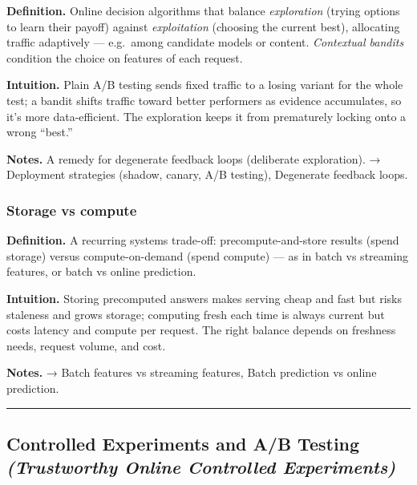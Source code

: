 \documentclass[
  10pt,
  letterpaper,
  onecolumn]{article}
\begin{document}
\textbf{Definition.} Online decision algorithms that balance
\emph{exploration} (trying options to learn their payoff) against
\emph{exploitation} (choosing the current best), allocating traffic
adaptively --- e.g.~among candidate models or content. \emph{Contextual
bandits} condition the choice on features of each request.

\textbf{Intuition.} Plain A/B testing sends fixed traffic to a losing
variant for the whole test; a bandit shifts traffic toward better
performers as evidence accumulates, so it's more data-efficient. The
exploration keeps it from prematurely locking onto a wrong ``best.''

\textbf{Notes.} A remedy for degenerate feedback loops (deliberate
exploration). → Deployment strategies (shadow, canary, A/B testing),
Degenerate feedback loops.

\hypertarget{storage-vs-compute}{%
\subsubsection{Storage vs compute}\label{storage-vs-compute}}

\textbf{Definition.} A recurring systems trade-off: precompute-and-store
results (spend storage) versus compute-on-demand (spend compute) --- as
in batch vs streaming features, or batch vs online prediction.

\textbf{Intuition.} Storing precomputed answers makes serving cheap and
fast but risks staleness and grows storage; computing fresh each time is
always current but costs latency and compute per request. The right
balance depends on freshness needs, request volume, and cost.

\textbf{Notes.} → Batch features vs streaming features, Batch prediction
vs online prediction.

\begin{center}\rule{0.5\linewidth}{0.5pt}\end{center}

\hypertarget{controlled-experiments-and-ab-testing-trustworthy-online-controlled-experiments}{%
\subsection{\texorpdfstring{Controlled Experiments and A/B Testing
\emph{(Trustworthy Online Controlled
Experiments)}}{Controlled Experiments and A/B Testing (Trustworthy Online Controlled Experiments)}}\label{controlled-experiments-and-ab-testing-trustworthy-online-controlled-experiments}}
\end{document}
